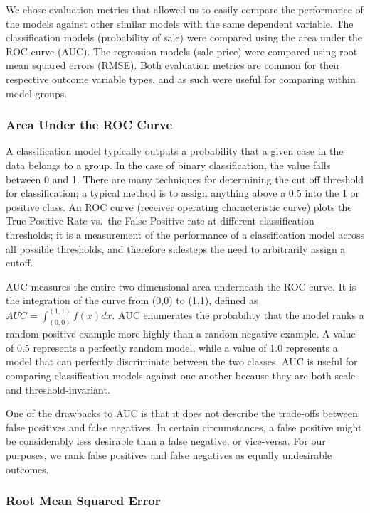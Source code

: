 \documentclass[12pt,]{article}
\begin{document}
We chose evaluation metrics that allowed us to easily compare the
performance of the models against other similar models with the same
dependent variable. The classification models (probability of sale) were
compared using the area under the ROC curve (AUC). The regression models
(sale price) were compared using root mean squared errors (RMSE). Both
evaluation metrics are common for their respective outcome variable
types, and as such were useful for comparing within model-groups.

\hypertarget{area-under-the-roc-curve}{%
\subsubsection{Area Under the ROC
Curve}\label{area-under-the-roc-curve}}

A classification model typically outputs a probability that a given case
in the data belongs to a group. In the case of binary classification,
the value falls between 0 and 1. There are many techniques for
determining the cut off threshold for classification; a typical method
is to assign anything above a 0.5 into the 1 or positive class. An ROC
curve (receiver operating characteristic curve) plots the True Positive
Rate vs.~the False Positive rate at different classification thresholds;
it is a measurement of the performance of a classification model across
all possible thresholds, and therefore sidesteps the need to arbitrarily
assign a cutoff.

AUC measures the entire two-dimensional area underneath the ROC curve.
It is the integration of the curve from (0,0) to (1,1), defined as
\(AUC = \int_{(0,0)}^{(1,1)} f(x)dx\). AUC enumerates the probability
that the model ranks a random positive example more highly than a random
negative example. A value of 0.5 represents a perfectly random model,
while a value of 1.0 represents a model that can perfectly discriminate
between the two classes. AUC is useful for comparing classification
models against one another because they are both scale and
threshold-invariant.

One of the drawbacks to AUC is that it does not describe the trade-offs
between false positives and false negatives. In certain circumstances, a
false positive might be considerably less desirable than a false
negative, or vice-versa. For our purposes, we rank false positives and
false negatives as equally undesirable outcomes.

\hypertarget{root-mean-squared-error}{%
\subsubsection{Root Mean Squared Error}\label{root-mean-squared-error}}
\end{document}
